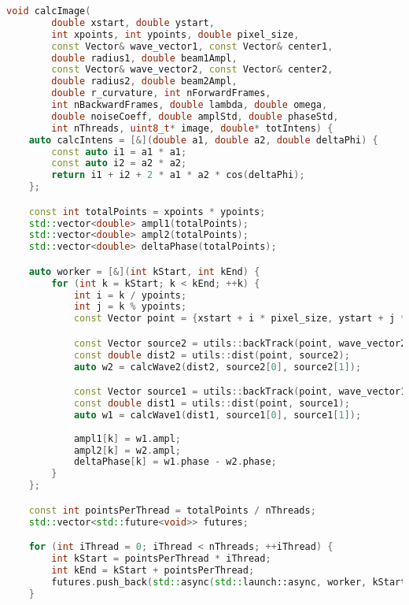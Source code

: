\captiondelim{ } %
\begin{lstlisting}[language=C++,tabsize=4,label={lst:calcImage},caption={Листинг функции вычисления интерференционной картины}]
void calcImage(
		double xstart, double ystart, 
		int xpoints, int ypoints, double pixel_size,
		const Vector& wave_vector1, const Vector& center1, 
		double radius1, double beam1Ampl,
        const Vector& wave_vector2, const Vector& center2, 
        double radius2, double beam2Ampl, 
        double r_curvature, int nForwardFrames, 
        int nBackwardFrames, double lambda, double omega, 
        double noiseCoeff, double amplStd, double phaseStd,
        int nThreads, uint8_t* image, double* totIntens) {
    auto calcIntens = [&](double a1, double a2, double deltaPhi) {
        const auto i1 = a1 * a1;
        const auto i2 = a2 * a2;
        return i1 + i2 + 2 * a1 * a2 * cos(deltaPhi);
    };

    const int totalPoints = xpoints * ypoints;
    std::vector<double> ampl1(totalPoints);
    std::vector<double> ampl2(totalPoints);
    std::vector<double> deltaPhase(totalPoints);

    auto worker = [&](int kStart, int kEnd) {
        for (int k = kStart; k < kEnd; ++k) {
		    int i = k / ypoints;
		    int j = k % ypoints;
		    const Vector point = {xstart + i * pixel_size, ystart + j * pixel_size, 0};

            const Vector source2 = utils::backTrack(point, wave_vector2, center2);
            const double dist2 = utils::dist(point, source2);
            auto w2 = calcWave2(dist2, source2[0], source2[1]);

            const Vector source1 = utils::backTrack(point, wave_vector1, center1);
            const double dist1 = utils::dist(point, source1);
	        auto w1 = calcWave1(dist1, source1[0], source1[1]);
	        
            ampl1[k] = w1.ampl;
            ampl2[k] = w2.ampl;
            deltaPhase[k] = w1.phase - w2.phase;
		}
	};

	const int pointsPerThread = totalPoints / nThreads;
	std::vector<std::future<void>> futures;

	for (int iThread = 0; iThread < nThreads; ++iThread) {
		int kStart = pointsPerThread * iThread;
		int kEnd = kStart + pointsPerThread;
		futures.push_back(std::async(std::launch::async, worker, kStart, kEnd));
	}


\end{lstlisting}
